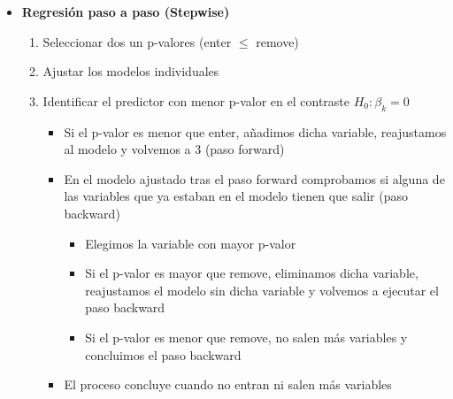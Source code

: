 \begin{itemize}
    \item \textbf{Regresión paso a paso (Stepwise)}\begin{enumerate}
        \item Seleccionar dos un p-valores (enter $\leq$ remove)
        \item Ajustar los modelos individuales
        \item Identificar el predictor con menor p-valor en el contraste $H_0:\beta_k=0$
        \begin{itemize}
            \item Si el p-valor es menor que enter, añadimos dicha variable, reajustamos al modelo y volvemos a 3 (paso forward)
            \item En el modelo ajustado tras el paso forward comprobamos si alguna de las variables que ya estaban en el modelo tienen que salir (paso backward)
            \begin{itemize}
                \item Elegimos la variable con mayor p-valor
                \item Si el p-valor es mayor que remove, eliminamos dicha variable, reajustamos el modelo sin dicha variable y volvemos a ejecutar el paso backward
                \item Si el p-valor es menor que remove, no salen más variables y concluimos el paso backward
            \end{itemize}
            \item El proceso concluye cuando no entran ni salen más variables
        \end{itemize}
    \end{enumerate}
\end{itemize}
